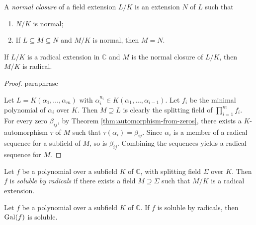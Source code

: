 \begin{definition}
	A \textit{normal closure} of a field extension $L / K$ is an extension $N$ of $L$ such that 
	\begin{enumerate}
		\item $N / K$ is normal;
		\item If $L \subseteq M \subseteq N$ and $M / K$ is normal, then $M = N$.
	\end{enumerate}
\end{definition}

\begin{theorem} \label{thm:radical-closure}
    If $L / K$ is a radical extension in $\mathbb{C}$ and $M$ is the normal closure of $L / K$, then $M / K$ is radical.
\end{theorem}

\begin{proof}
\TODO paraphrase

Let $L=K\left(\alpha_1, \ldots, \alpha_m\right)$ with $\alpha_i^{n_i} \in K\left(\alpha_1, \ldots, \alpha_{i-1}\right)$. Let $f_i$ be the minimal polynomial of $\alpha_i$ over $K$. Then $M \supseteq L$ is clearly the splitting field of $\prod_{i=1}^m f_i$. For every zero $\beta_{i j}$, by Theorem \ref{thm:automorphism-from-zeros}, there exists a $K$-automorphism $\tau$ of $M$ such that $\tau(\alpha_i) = \beta_{ij}$. Since $\alpha_i$ is a member of a radical sequence for a subfield of $M$, so is $\beta_{i j}$. Combining the sequences yields a radical sequence for $M$.
\end{proof}


\begin{definition}
    Let $f$ be a polynomial over a subfield $K$ of $\mathbb{C}$, with splitting field $\Sigma$ over $K$. Then $f$ is \textit{soluble by radicals} if there exists a field $M \supseteq \Sigma$ such that $M / K$ is a radical extension.  
\end{definition}


\begin{theorem} \label{thm:radical-galois-soluble}
    Let $f$ be a polynomial over a subfield $K$ of $\mathbb{C}$. If $f$ is soluble by radicals, then $\operatorname{Gal}(f)$ is soluble.
\end{theorem}

